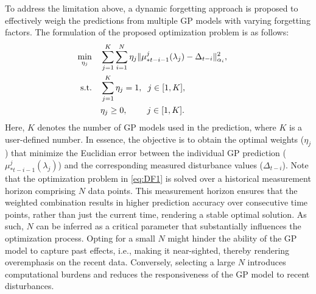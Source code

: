  To address the limitation above, a dynamic forgetting approach is proposed to effectively weigh the predictions from multiple \ac{GP} models with varying forgetting factors. The formulation of the proposed optimization problem is as follows:
%
\begin{subequations} \label{eq:DF}
\begin{align}
	\minimize_{{\eta}_j} \quad & \sum_{j = 1}^{K} \sum_{i = 1}^{N} {\eta}_j  \|\mu^{j}_{*t-i-1}(\lambda_j)- \Delta_{t-i}\|^{2}_{\alpha_i}, \
  \label{eq:DF1} \\
    	\textrm{s.t.} \quad & \sum_{j = 1}^{K} {\eta}_j = 1 , \hspace{0.2cm} j \in [1, K],  &   \label{eq:DF2} \\
    &  {\eta}_j \geq 0 , \hspace{0.8cm} j \in [1, K]. &   \label{eq:DF2} 
\end{align}
\end{subequations}
%
Here, \(K\) denotes the number of \ac{GP} models used in the prediction, where $K$ is a user-defined number. In essence, the objective is to obtain the optimal weights ($\eta_{j}$) that minimize the Euclidian error between the individual GP prediction ($\mu_{*t-i-1}^{j}(\lambda_j)$) and the corresponding measured disturbance values ($\Delta_{t-i}$). %
%
%
%
Note that the optimization problem in \eqref{eq:DF1} is solved over a historical measurement horizon comprising $N$ data points. This measurement horizon ensures that the weighted combination results in higher prediction accuracy over consecutive time points, rather than just the current time, rendering a stable optimal solution. As such, $N$ can be inferred as a critical parameter that substantially influences the optimization process. Opting for a small $N$ might hinder the ability of the \ac{GP} model to capture past effects, i.e., making it near-sighted, thereby rendering overemphasis on the recent data. Conversely, selecting a large $N$ introduces computational burdens and reduces the responsiveness of the \ac{GP} model to recent disturbances.
%


